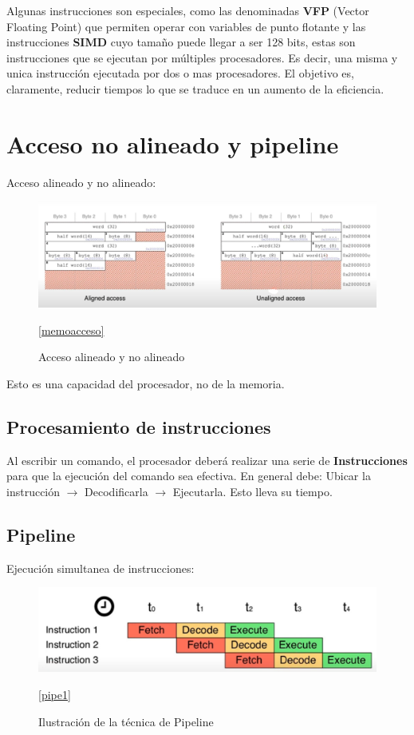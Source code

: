 \documentclass[a4paper,12pt]{report} %
\begin{document}
Algunas instrucciones son especiales, como las denominadas \textbf{VFP} (Vector Floating Point) que permiten operar con variables de punto flotante y las instrucciones \textbf{SIMD} cuyo tamaño puede llegar a ser 128 bits, estas son instrucciones que se ejecutan por múltiples procesadores. Es decir, una misma y unica instrucción ejecutada por dos o mas procesadores. El objetivo es, claramente, reducir tiempos lo que se traduce en un aumento de la eficiencia.

\section{Acceso no alineado y pipeline}

Acceso alineado y no alineado: 

\begin{figure}[H]
	\centering
	\includegraphics[scale=0.45]{Imagenes/stm/alignednotaligned}
	\caption{Acceso alineado y no alineado}
	\ref{memoacceso}
\end{figure}

Esto es una capacidad del procesador, no de la memoria.

 \subsection{Procesamiento de instrucciones}
 
 Al escribir un comando, el procesador deberá realizar una serie de \textbf{Instrucciones} para que la ejecución del comando sea efectiva. En general debe: Ubicar la instrucción $\rightarrow$ Decodificarla $\rightarrow$ Ejecutarla. Esto lleva su tiempo.
 
 \subsection{Pipeline}
 
Ejecución simultanea de instrucciones: 

\begin{figure}[H]
	\centering
	\includegraphics[scale=0.4]{Imagenes/stm/pipeline1}
	\caption{Ilustración de la técnica de Pipeline}
	\ref{pipe1}
\end{figure}
\end{document}
